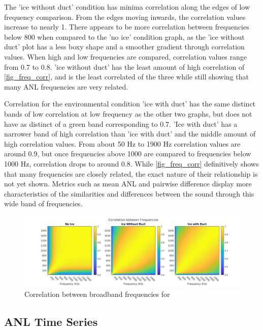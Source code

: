 The 'ice without duct' condition has minima correlation along the edges of low frequency comparison. From the edges moving inwards, the correlation values increase to nearly 1. There appears to be more correlation between frequencies below 800 when compared to the 'no ice' condition graph, as the 'ice without duct' plot has a less boxy shape and a smoother gradient through correlation values. When high and low frequencies are compared, correlation values range from 0.7 to 0.8. 'ice without duct' has the least amount of high correlation of \autoref{fig_freq_corr}, and is the least correlated of the three while still showing that many ANL frequencies are very related.

Correlation for the environmental condition 'ice with duct' has the same distinct bands of low correlation at low frequency as the other two graphs, but does not have as distinct of a green band corresponding to 0.7. 'Ice with duct' has a narrower band of high correlation than 'ice with duct' and the middle amount of high correlation values. From about 50 Hz to 1900 Hz correlation values are around 0.9, but once frequencies above 1000 are compared to frequencies below 1000 Hz, correlation drops to around 0.8. While \autoref{fig_freq_corr} definitively shows that many frequencies are closely related, the exact nature of their relationship is not yet shown. Metrics such as mean ANL and pairwise difference display more characteristics of the similarities and differences between the sound through this wide band of frequencies.

\begin{figure}[ht]
\centering
\includegraphics[scale=0.35]{Figures/corr_all_1x3.jpg}
\caption{Correlation between broadband frequencies for }
\label{fig_freq_corr}
\end{figure}

\subsection{ANL Time Series}\label{sec_timeseries}

